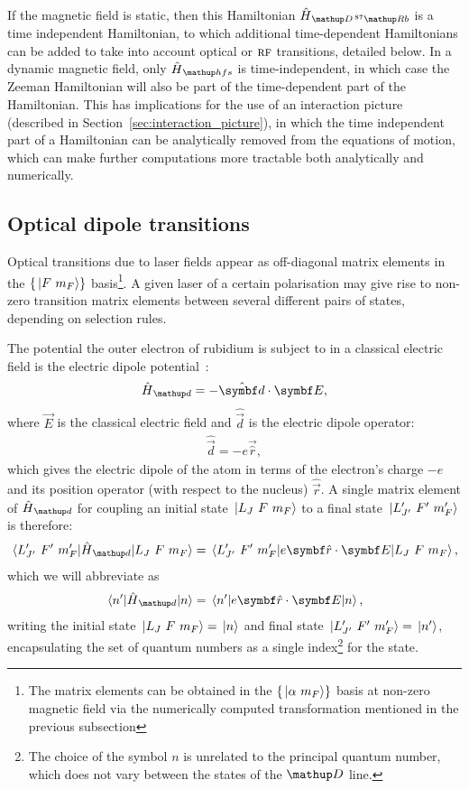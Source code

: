 If the magnetic field is static, then this Hamiltonian $\hat{H}_{\up{D}\,^{87}\up{Rb}}$ is a time independent Hamiltonian, to which additional time-dependent Hamiltonians can be added to take into account optical or $\textsc{rf}$ transitions, detailed below. In a dynamic magnetic field, only $\hat H_\up{hfs}$ is time-independent, in which case the Zeeman Hamiltonian will also be part of the time-dependent part of the Hamiltonian. This has implications for the use of an interaction picture (described in Section~\ref{sec:interaction_picture}), in which the time independent part of a Hamiltonian can be analytically removed from the equations of motion, which can make further computations more tractable both analytically and numerically.

\subsection{Optical dipole transitions}\label{sec:optical_dipole_transitions}

Optical transitions due to laser fields appear as off-diagonal matrix elements in the $\{\ket{F\ m_F}\}$ basis\footnote{The matrix elements can be obtained in the $\{\ket{\alpha\ m_F}\}$ basis at non-zero magnetic field via the numerically computed transformation mentioned in the previous subsection}. A given laser of a certain polarisation may give rise to non-zero transition matrix elements between several different pairs of states, depending on selection rules.

The potential the outer electron of rubidium is subject to in a classical electric field is the electric dipole potential~\cite{metcalf_laser_1999, steck_quantum_2017}:
\begin{align}
\hat H_\up{d} = -\hat{\vec d}\cdot\vec E,
\end{align}
where $\vec E$ is the classical electric field and $\hat{\vec d}$ is the electric dipole operator:
\begin{align}
\hat{\vec d} = -e\vec{\hat r},
\end{align}
which gives the electric dipole of the atom in terms of the electron's charge $-e$ and its position operator (with respect to the nucleus) $\hat{\vec r}$. A single matrix element of $\hat H_\up{d}$ for coupling an initial state $\ket{L_J\ F\ m_F}$ to a final state $\ket{L^\prime_{J^\prime}\ F^\prime\ m_F^\prime}$ is therefore:
\begin{align}\label{eq:electric_dipole_potential}
\matrixel{L^\prime_{J^\prime}\ F^\prime\ m_F^\prime}{\hat H_\up{d}}{L_J\ F\ m_F} = 
\matrixel{L^\prime_{J^\prime}\ F^\prime\ m_F^\prime}{e\vec{\hat r}\cdot\vec E}{L_J\ F\ m_F},
\end{align}
which we will abbreviate as
\begin{align}
\matrixel{n^\prime}{\hat H_\up{d}}{n} = 
\matrixel{n^\prime}{e\vec{\hat r}\cdot\vec E}{n},
\end{align}
writing the initial state $\ket{L_J\ F\ m_F}=\ket{n}$ and final state $\ket{L^\prime_{J^\prime}\ F^\prime\ m_F^\prime}=\ket{n^\prime}$, encapsulating the set of quantum numbers as a single index\footnote{The choice of the symbol $n$ is unrelated to the principal quantum number, which does not vary between the states of the $\up{D}$ line.} for the state.

